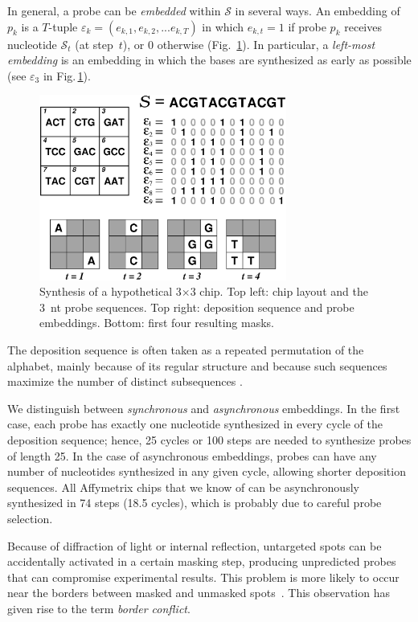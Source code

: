 \documentclass{llncs}
\begin{document}
In general, a probe can be \emph{embedded} within $\mathcal{S}$ in several
ways. An embedding of $p_{k}$ is a $T$-tuple
$\varepsilon_{k} = (e_{k,1}, e_{k,2}, ... e_{k,T})$ in which $e_{k,t} = 1$
if probe $p_{k}$ receives nucleotide $\mathcal{S}_{t}$ (at step~$t$), or 0 otherwise
(Fig.~\ref{fig:masking_process}). In particular, a \emph{left-most embedding}
is an embedding in which the bases are synthesized as early as possible
(see $\varepsilon_3$ in Fig.\,\ref{fig:masking_process}).

\begin{figure}
\centerline{\includegraphics[width=230pt]{chip}}
\caption{Synthesis of a hypothetical 3$\times$3 chip. Top left: chip
layout and the 3~nt probe sequences. Top right: deposition
sequence and probe embeddings. Bottom: first four resulting masks.}
\label{fig:masking_process}
\vspace*{-2ex}
\end{figure}

The deposition sequence is often taken as a repeated permutation of the
alphabet, mainly because of its regular structure and because such sequences
maximize the number of distinct subsequences \cite{CHASE76}.  

We distinguish between \emph{synchronous} and \emph{asynchronous} embeddings.
In the first case, each probe has exactly one nucleotide synthesized in every
cycle of the deposition sequence; hence, 25 cycles or 100 steps are needed to
synthesize probes of length 25.  In the case of asynchronous embeddings,
probes can have any number of nucleotides synthesized in any given cycle,
allowing shorter deposition sequences. All Affymetrix chips that we know of
can be asynchronously synthesized in 74 steps (18.5 cycles), which is probably
due to careful probe selection.

Because of diffraction of light or internal reflection, untargeted spots can
be accidentally activated in a certain masking step, producing unpredicted
probes that can compromise experimental results. This problem is more likely
to occur near the borders between masked and unmasked spots~\cite{FODOR91}.
This observation has given rise to the term \emph{border conflict}.
\end{document}
